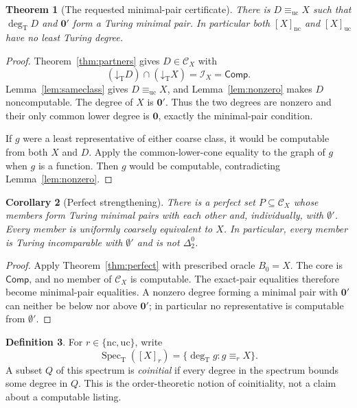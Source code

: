 \documentclass[11pt,a4paper]{article}
\newcommand{\degT}{\operatorname{deg}_{\mathrm T}}
\newcommand{\nc}{\mathrm{nc}}
\newcommand{\uc}{\mathrm{uc}}
\newcommand{\CD}{\mathcal C}
\newcommand{\core}{\mathcal I}
\newcommand{\Comp}{\mathsf{Comp}}
\newcommand{\low}[1]{\mathord\downarrow_{\!\mathrm T}#1}
\newcommand{\Spec}{\operatorname{Spec}_{\mathrm T}}
\newtheorem{theorem}{Theorem}[section]
\newtheorem{corollary}[theorem]{Corollary}
\theoremstyle{definition}\newtheorem{definition}[theorem]{Definition}
\theoremstyle{remark}\newtheorem{remark}[theorem]{Remark}
\begin{document}
\begin{theorem}[The requested minimal-pair certificate]\label{thm:minpair}
There is $D\equiv_{\uc}X$ such that $\degT D$ and $\mathbf0'$ form a Turing
minimal pair. In particular both $[X]_{\nc}$ and $[X]_{\uc}$ have no least
Turing degree.
\end{theorem}
\begin{proof}
Theorem~\ref{thm:partners} gives $D\in\CD_X$ with
\[
 (\low D)\cap(\low X)=\core_X=\Comp.
\]
Lemma~\ref{lem:sameclass} gives $D\equiv_{\uc}X$, and
Lemma~\ref{lem:nonzero} makes $D$ noncomputable. The degree of $X$ is
$\mathbf0'$. Thus the two degrees are nonzero and their only common lower
degree is $\mathbf0$, exactly the minimal-pair condition.

If $g$ were a least representative of either coarse class, it would be
computable from both $X$ and $D$. Apply the common-lower-cone equality to the
graph of $g$ when $g$ is a function. Then $g$ would be computable, contradicting
Lemma~\ref{lem:nonzero}.
\end{proof}

\begin{corollary}[Perfect strengthening]\label{cor:perfectminimal}
There is a perfect set $P\subseteq\CD_X$ whose members form Turing minimal
pairs with each other and, individually, with $\emptyset'$. Every member is
uniformly coarsely equivalent to $X$. In particular, every member is Turing
incomparable with $\emptyset'$ and is not $\Delta^0_2$.
\end{corollary}
\begin{proof}
Apply Theorem~\ref{thm:perfect} with prescribed oracle $B_0=X$. The core is
$\Comp$, and no member of $\CD_X$ is computable. The exact-pair equalities
therefore become minimal-pair equalities. A nonzero degree forming a minimal
pair with $\mathbf0'$ can neither be below nor above $\mathbf0'$; in
particular no representative is computable from $\emptyset'$.
\end{proof}

\begin{definition}
For $r\in\{\nc,\uc\}$, write
\[
 \Spec([X]_r)=\{\degT g:g\equiv_r X\}.
\]
A subset $Q$ of this spectrum is \emph{coinitial} if every degree in the
spectrum bounds some degree in $Q$. This is the order-theoretic notion of
coinitiality, not a claim about a computable listing.
\end{definition}
\end{document}
